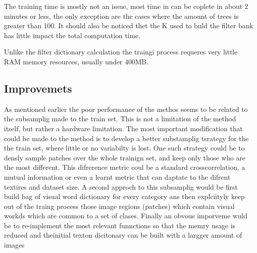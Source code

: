 \documentclass[a4paper]{article}
\begin{document}
     
The training time is mostly not an issue, most time in can be coplete in about 2 minutes or less,  the only exception are the cases where the amount of trees is greater than 100. It should also be noticed thet the K used to buld the filter bank has little impact the total computation time.

Unlike the filter dictionary calculation the traingi process requeres very little RAM memory resources, usually under 400MB.

\subsection{Improvemets}
As mentioned earlier the poor performance of the methos seems to be related to the subsamplig made to the train set. This is not a limitation of the method itself, but rather a hardware limitation. 
The most important modification that could be made to the method is to develop a better  substamplig tsrategy for the the train set, where little or no variabilty is lost. One such strategy could be to densly sample patches over the whole trainign set, and keep only those who are the most different. This difrerence metric coul be a standard crosscorrelation, a mutual information or even a learnt metric that can daptate to the difrent textires and dataset size. A second approch to this subsamplig would be first build bag of visual word dictionary for every category ans then explciityly keep out of the traing process those image regions (patches) which contain visual workds which are common to a set of clases. Finally an obvous imporveme wuld be to re-implement the most relevant funnctions so that the memry usage is reduced and theinitial texton dicitonary can be built with a largger amount of images




\end{document}
